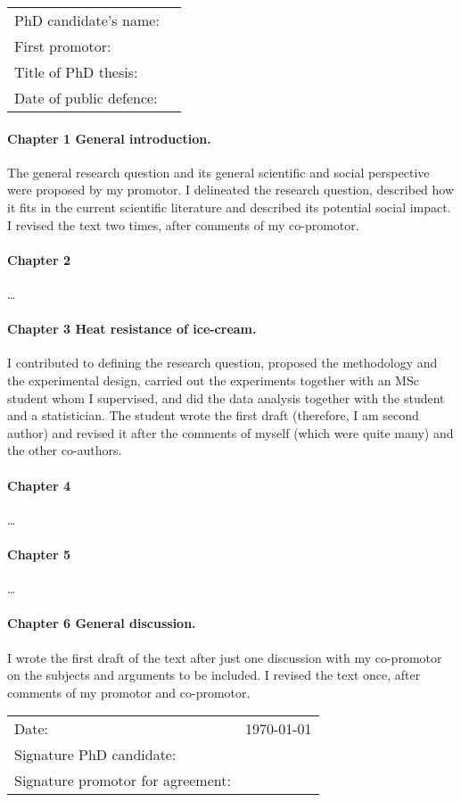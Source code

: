 \documentclass[a4paper]{article}
\begin{document}
\begin{tabular}{@{}p{}p{}@{}}
    PhD candidate’s name: & \theauthor{} \\
    First promotor: & \firstpromotor{} \\
    Title of PhD thesis: & \thetitle{} \\
    Date of public defence: & {}
\end{tabular}

\paragraph{Chapter 1 General introduction.}
The general research question and its general scientific
and social perspective were proposed by my promotor. I delineated the research
question, described how it fits in the current scientific literature and described its
potential social impact. I revised the text two times, after comments of my co-promotor.

\paragraph{Chapter 2} \dots

\paragraph{Chapter 3 Heat resistance of ice-cream.} 
I contributed to defining the research question,
proposed the methodology and the experimental design, carried out the experiments
together with an MSc student whom I supervised, and did the data analysis together with
the student and a statistician. The student wrote the first draft (therefore, I am second
author) and revised it after the comments of myself (which were quite many) and the
other co-authors.

\paragraph{Chapter 4} \dots

\paragraph{Chapter 5} \dots

\paragraph{Chapter 6 General discussion.}
I wrote the first draft of the text after just one discussion
with my co-promotor on the subjects and arguments to be included. I revised the text
once, after comments of my promotor and co-promotor.

\vspace*{\fill}

{\renewcommand{\arraystretch}{2}
\begin{tabular}{@{}ll@{}}
    Date: & \today{} \\
    Signature PhD candidate: & \\
    Signature promotor for agreement: & 
\end{tabular}
}
\end{document}
